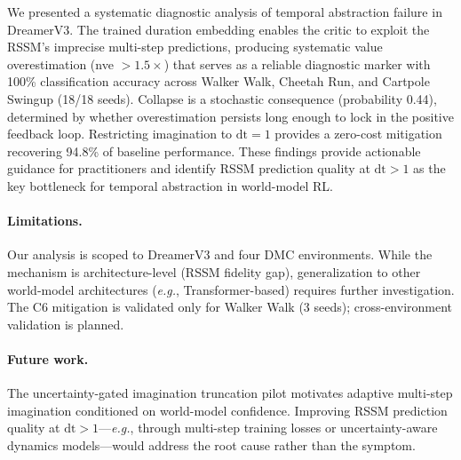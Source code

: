 \documentclass[10pt,letterpaper]{article}
\newcommand{\dt}{\mathrm{dt}}
\newcommand{\eg}{\textit{e.g.}}
\begin{document}
We presented a systematic diagnostic analysis of temporal abstraction failure in DreamerV3.
The trained duration embedding enables the critic to exploit the RSSM's imprecise multi-step predictions, producing systematic value overestimation (nve $> 1.5\times$) that serves as a reliable diagnostic marker with 100\% classification accuracy across Walker Walk, Cheetah Run, and Cartpole Swingup (18/18 seeds).
Collapse is a stochastic consequence (probability 0.44), determined by whether overestimation persists long enough to lock in the positive feedback loop.
Restricting imagination to $\dt=1$ provides a zero-cost mitigation recovering 94.8\% of baseline performance.
These findings provide actionable guidance for practitioners and identify RSSM prediction quality at $\dt > 1$ as the key bottleneck for temporal abstraction in world-model RL.

\paragraph{Limitations.}
Our analysis is scoped to DreamerV3 and four DMC environments.
While the mechanism is architecture-level (RSSM fidelity gap), generalization to other world-model architectures (\eg, Transformer-based) requires further investigation.
The C6 mitigation is validated only for Walker Walk (3 seeds); cross-environment validation is planned.

\paragraph{Future work.}
The uncertainty-gated imagination truncation pilot motivates adaptive multi-step imagination conditioned on world-model confidence.
Improving RSSM prediction quality at $\dt > 1$---\eg, through multi-step training losses or uncertainty-aware dynamics models---would address the root cause rather than the symptom.


\end{document}
